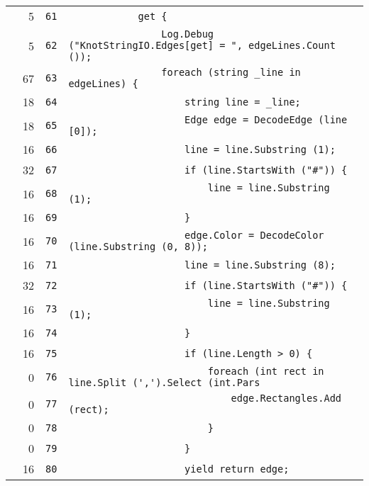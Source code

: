 \documentclass[a4paper,10pt]{article}
\begin{document}
\begin{longtable}[l]{lrrl}
\cellcolor{green} & 5 & \verb~61~ & \verb~            get {~\\
\cellcolor{green} & 5 & \verb~62~ & \verb~                Log.Debug ("KnotStringIO.Edges[get] = ", edgeLines.Count ());~\\
\cellcolor{green} & 67 & \verb~63~ & \verb~                foreach (string _line in edgeLines) {~\\
\cellcolor{green} & 18 & \verb~64~ & \verb~                    string line = _line;~\\
\cellcolor{green} & 18 & \verb~65~ & \verb~                    Edge edge = DecodeEdge (line [0]);~\\
\cellcolor{green} & 16 & \verb~66~ & \verb~                    line = line.Substring (1);~\\
\cellcolor{green} & 32 & \verb~67~ & \verb~                    if (line.StartsWith ("#")) {~\\
\cellcolor{green} & 16 & \verb~68~ & \verb~                        line = line.Substring (1);~\\
\cellcolor{green} & 16 & \verb~69~ & \verb~                    }~\\
\cellcolor{green} & 16 & \verb~70~ & \verb~                    edge.Color = DecodeColor (line.Substring (0, 8));~\\
\cellcolor{green} & 16 & \verb~71~ & \verb~                    line = line.Substring (8);~\\
\cellcolor{green} & 32 & \verb~72~ & \verb~                    if (line.StartsWith ("#")) {~\\
\cellcolor{green} & 16 & \verb~73~ & \verb~                        line = line.Substring (1);~\\
\cellcolor{green} & 16 & \verb~74~ & \verb~                    }~\\
\cellcolor{green} & 16 & \verb~75~ & \verb~                    if (line.Length > 0) {~\\
\cellcolor{red} & 0 & \verb~76~ & \verb~                        foreach (int rect in line.Split (',').Select (int.Pars~\\
\cellcolor{red} & 0 & \verb~77~ & \verb~                            edge.Rectangles.Add (rect);~\\
\cellcolor{red} & 0 & \verb~78~ & \verb~                        }~\\
\cellcolor{red} & 0 & \verb~79~ & \verb~                    }~\\
\cellcolor{green} & 16 & \verb~80~ & \verb~                    yield return edge;~\\

\end{longtable}
\end{document}
